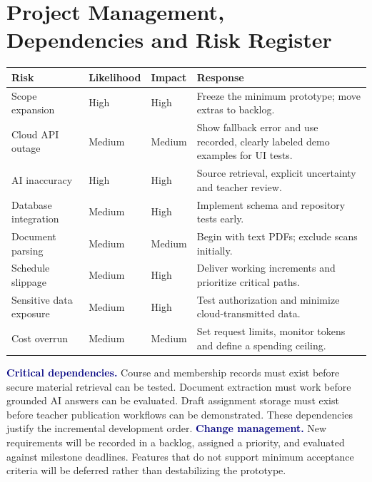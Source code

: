 \documentclass[11pt,a4paper]{article}
\newcommand{\heading}[1]{\vspace{5pt}\textcolor{navy}{\textbf{#1}}}
\begin{document}
\section{Project Management, Dependencies and Risk Register}
\begin{longtable}{p{}p{}p{}p{}}
\toprule Risk & Likelihood & Impact & Response\\\midrule\endhead
Scope expansion & High & High & Freeze the minimum prototype; move extras to backlog.\\
Cloud API outage & Medium & Medium & Show fallback error and use recorded, clearly labeled demo examples for UI tests.\\
AI inaccuracy & High & High & Source retrieval, explicit uncertainty and teacher review.\\
Database integration & Medium & High & Implement schema and repository tests early.\\
Document parsing & Medium & Medium & Begin with text PDFs; exclude scans initially.\\
Schedule slippage & Medium & High & Deliver working increments and prioritize critical paths.\\
Sensitive data exposure & Medium & High & Test authorization and minimize cloud-transmitted data.\\
Cost overrun & Medium & Medium & Set request limits, monitor tokens and define a spending ceiling.\\
\bottomrule
\end{longtable}
\heading{Critical dependencies.} Course and membership records must exist before secure material retrieval can be tested. Document extraction must work before grounded AI answers can be evaluated. Draft assignment storage must exist before teacher publication workflows can be demonstrated. These dependencies justify the incremental development order.
\heading{Change management.} New requirements will be recorded in a backlog, assigned a priority, and evaluated against milestone deadlines. Features that do not support minimum acceptance criteria will be deferred rather than destabilizing the prototype.
\end{document}
